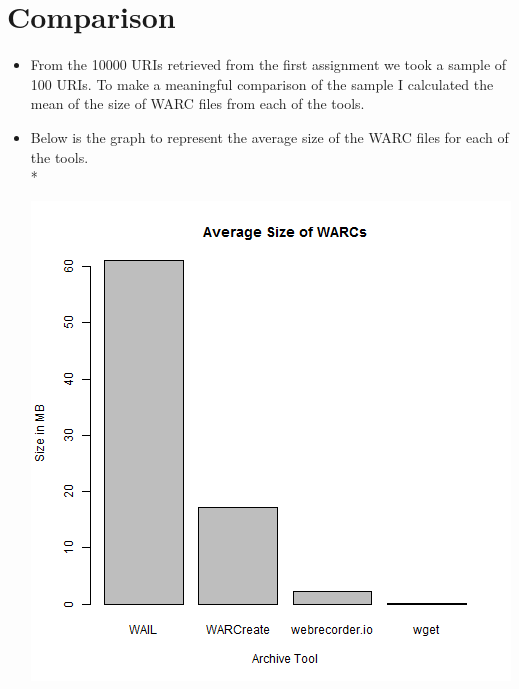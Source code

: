 \section{Comparison}
\begin{itemize}
\item From the 10000 URIs retrieved from the first assignment we took a sample of 100 URIs. To make a meaningful comparison of the sample I calculated the mean of the size of WARC files from each of the tools.
\item Below is the graph to represent the average size of the WARC files for each of the tools. \\*
	\begin{minipage}{\linewidth}
		\centering
		\includegraphics[scale=0.55]{figures/avgWarcSizeForTool.png}
		\label{avgWarcSizeForTool}
	\end{minipage}


\end{itemize}
